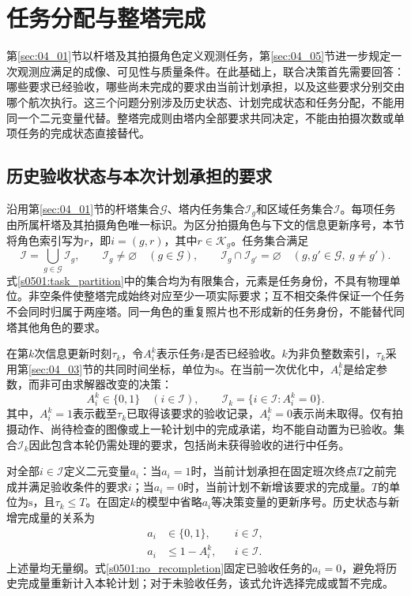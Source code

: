 \section{任务分配与整塔完成}
\label{sec:05_01}

第\ref{sec:04_01}节以杆塔及其拍摄角色定义观测任务，第\ref{sec:04_05}节进一步规定一次观测应满足的成像、可见性与质量条件。在此基础上，联合决策首先需要回答：哪些要求已经验收，哪些尚未完成的要求由当前计划承担，以及这些要求分别交由哪个航次执行。这三个问题分别涉及历史状态、计划完成状态和任务分配，不能用同一个二元变量代替。整塔完成则由塔内全部要求共同决定，不能由拍摄次数或单项任务的完成状态直接替代。

\subsection{历史验收状态与本次计划承担的要求}

沿用第\ref{sec:04_01}节的杆塔集合$\mathcal G$、塔内任务集合$\mathcal I_g$和区域任务集合$\mathcal I$。每项任务由所属杆塔及其拍摄角色唯一标识。为区分拍摄角色与下文的信息更新序号，本节将角色索引写为$r$，即$i=(g,r)$，其中$r\in\mathcal K_g$。任务集合满足
\begin{equation}
 \mathcal I=\bigcup_{g\in\mathcal G}\mathcal I_g,\qquad
 \mathcal I_g\ne\varnothing\quad(g\in\mathcal G),\qquad
 \mathcal I_g\cap\mathcal I_{g'}=\varnothing
 \quad(g,g'\in\mathcal G,\ g\ne g').
 \label{s0501:task_partition}
\end{equation}
式\eqref{s0501:task_partition}中的集合均为有限集合，元素是任务身份，不具有物理单位。非空条件使整塔完成始终对应至少一项实际要求；互不相交条件保证一个任务不会同时归属于两座塔。同一角色的重复照片也不形成新的任务身份，不能替代同塔其他角色的要求。

在第$k$次信息更新时刻$\tau_k$，令$A_i^k$表示任务$i$是否已经验收。$k$为非负整数索引，$\tau_k$采用第\ref{sec:04_03}节的共同时间坐标，单位为$\mathrm{s}$。在当前一次优化中，$A_i^k$是给定参数，而非可由求解器改变的决策：
\begin{equation}
 A_i^k\in\{0,1\}\quad(i\in\mathcal I),\qquad
 \mathcal I_k=\{i\in\mathcal I:A_i^k=0\}.
 \label{s0501:accepted_state}
\end{equation}
其中，$A_i^k=1$表示截至$\tau_k$已取得该要求的验收记录，$A_i^k=0$表示尚未取得。仅有拍摄动作、尚待检查的图像或上一轮计划中的完成承诺，均不能自动置为已验收。集合$\mathcal I_k$因此包含本轮仍需处理的要求，包括尚未获得验收的进行中任务。

对全部$i\in\mathcal I$定义二元变量$a_i$：当$a_i=1$时，当前计划承担在固定班次终点$T$之前完成并满足验收条件的要求$i$；当$a_i=0$时，当前计划不新增该要求的完成量。$T$的单位为$\mathrm{s}$，且$\tau_k\le T$。在固定$k$的模型中省略$a_i$等决策变量的更新序号。历史状态与新增完成量的关系为
\begin{align}
 a_i&\in\{0,1\}, && i\in\mathcal I,\label{s0501:completion_domain}\\
 a_i&\le 1-A_i^k, && i\in\mathcal I.\label{s0501:no_recompletion}
\end{align}
上述量均无量纲。式\eqref{s0501:no_recompletion}固定已验收任务的$a_i=0$，避免将历史完成量重新计入本轮计划；对于未验收任务，该式允许选择完成或暂不完成。


